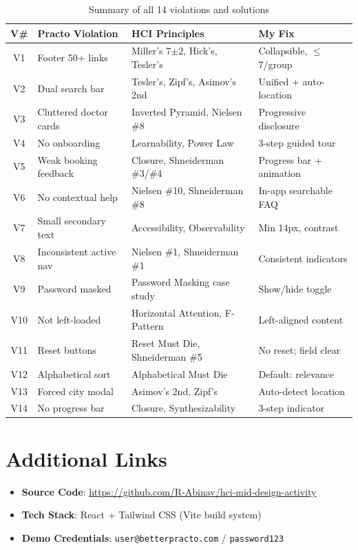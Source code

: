 \documentclass[12pt, a4paper]{article}
\begin{document}
\begin{table}[H]
\centering
\small
\renewcommand{\arraystretch}{1.3}
\begin{tabularx}{\textwidth}{|c|X|X|X|}
\hline
\textbf{V\#} & \textbf{Practo Violation} & \textbf{HCI Principles} & \textbf{My Fix} \\
\hline
V1 & Footer 50+ links & Miller's 7$\pm$2, Hick's, Tesler's & Collapsible, $\leq$7/group \\
V2 & Dual search bar & Tesler's, Zipf's, Asimov's 2nd & Unified + auto-location \\
V3 & Cluttered doctor cards & Inverted Pyramid, Nielsen \#8 & Progressive disclosure \\
V4 & No onboarding & Learnability, Power Law & 3-step guided tour \\
V5 & Weak booking feedback & Closure, Shneiderman \#3/\#4 & Progress bar + animation \\
V6 & No contextual help & Nielsen \#10, Shneiderman \#8 & In-app searchable FAQ \\
V7 & Small secondary text & Accessibility, Observability & Min 14px, contrast \\
V8 & Inconsistent active nav & Nielsen \#1, Shneiderman \#1 & Consistent indicators \\
V9 & Password masked & Password Masking case study & Show/hide toggle \\
V10 & Not left-loaded & Horizontal Attention, F-Pattern & Left-aligned content \\
V11 & Reset buttons & Reset Must Die, Shneiderman \#5 & No reset; field clear \\
V12 & Alphabetical sort & Alphabetical Must Die & Default: relevance \\
V13 & Forced city modal & Asimov's 2nd, Zipf's & Auto-detect location \\
V14 & No progress bar & Closure, Synthesizability & 3-step indicator \\
\hline
\end{tabularx}
\caption{Summary of all 14 violations and solutions}
\end{table}

\section{Additional Links}

\begin{itemize}[leftmargin=*]
    \item \textbf{Source Code}: \url{https://github.com/R-Abinav/hci-mid-design-activity}
    \item \textbf{Tech Stack}: React + Tailwind CSS (Vite build system)
    \item \textbf{Demo Credentials}: \texttt{user@betterpracto.com} / \texttt{password123}
\end{itemize}
\end{document}
